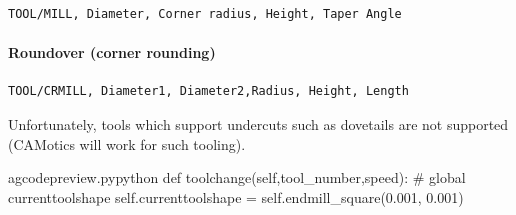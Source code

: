 \documentclass{ltxdoc}
\begin{document}
\begin{verbatim}
TOOL/MILL, Diameter, Corner radius, Height, Taper Angle
\end{verbatim}

\paragraph{Roundover (corner rounding)}

\begin{verbatim}
TOOL/CRMILL, Diameter1, Diameter2,Radius, Height, Length
\end{verbatim}

Unfortunately, tools which support undercuts such as dovetails are not supported (CAMotics will work for such tooling).

\lstset{firstnumber=\thegcpy}
\begin{writecode}{a}{gcodepreview.py}{python}
    def toolchange(self,tool_number,speed):
#        global currenttoolshape
        self.currenttoolshape = self.endmill_square(0.001, 0.001)    
            

\end{writecode}
\end{document}

